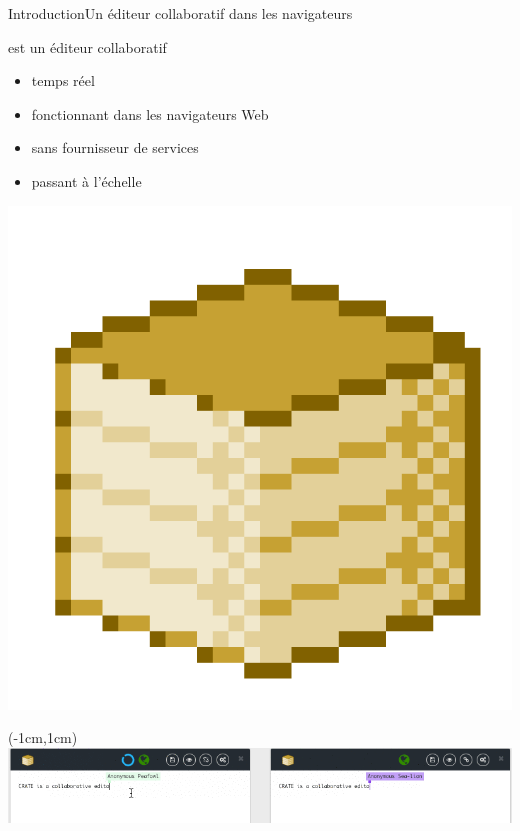 \begin{frame}{Introduction}{Un éditeur collaboratif dans les navigateurs}
  

  \begin{minipage}{0.69\textwidth}
    \CRATE est un éditeur collaboratif 
    \begin{itemize}
    \item temps réel \YES{\cmark}
    \item fonctionnant dans les navigateurs Web \YES{\cmark}
    \item sans fournisseur de services \YES{\cmark}
    \item passant à l'échelle \YES{\cmark}
    \end{itemize}
  \end{minipage}
  \begin{minipage}{0.3\textwidth}
    \includegraphics[width=\textwidth,interpolate=false]{img/crateicon.png}
  \end{minipage}
    
  
  \begin{textblock*}{1.18\textwidth}(-1cm,1cm)
    \includegraphics[width=1\textwidth]{img/animations/tmp-52.png}
  \end{textblock*}
  
  \vspace{1cm}

\end{frame}


